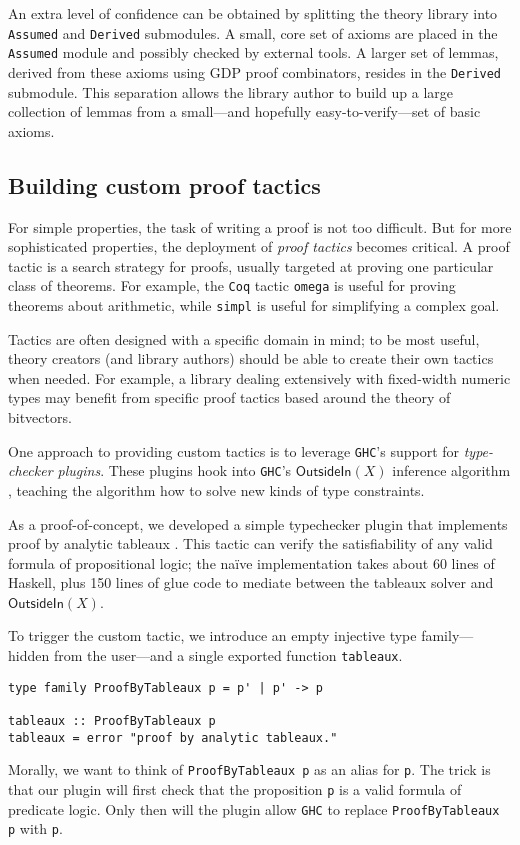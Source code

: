 \documentclass[format=sigplan, review=false, screen=true]{acmart}
\begin{document}
An extra level of confidence can be obtained by splitting the theory library
into \texttt{Assumed} and \texttt{Derived} submodules. A small, core set of
axioms are placed in the \texttt{Assumed} module and possibly checked by
external tools. A larger set of lemmas, derived from these axioms using GDP
proof combinators, resides in the \texttt{Derived} submodule. This separation
allows the library author to build up a large collection of lemmas from a
small---and hopefully easy-to-verify---set of basic axioms.

\subsection{Building custom proof tactics}\label{tactics}

For simple properties, the task of writing a proof is not too difficult. But for
more sophisticated properties, the deployment of \emph{proof tactics} becomes
critical. A proof tactic is a search strategy for proofs, usually targeted at
proving one particular class of theorems. For example, the \texttt{Coq} tactic
\texttt{omega} is useful for proving theorems about arithmetic, while
\texttt{simpl} is useful for simplifying a complex goal.

Tactics are often designed with a specific domain in mind; to be most useful,
theory creators (and library authors) should be able to create their own tactics
when needed. For example, a library dealing extensively with fixed-width numeric types
may benefit from specific proof tactics based around the theory of bitvectors.

One approach to providing custom tactics is to leverage \texttt{GHC}'s support for
\emph{type-checker plugins}. These plugins hook into \texttt{GHC}'s $\textsf{OutsideIn}(X)$
inference algorithm \cite{vytiniotis2011outsidein}, teaching the algorithm how to solve
new kinds of type constraints.

As a proof-of-concept, we developed a simple typechecker plugin that implements
proof by analytic tableaux \cite{smullyan1995first}. This tactic can verify the satisfiability of any
valid formula of propositional logic; the na\"ive implementation takes about
60 lines of Haskell, plus 150 lines of glue code to mediate between
the tableaux solver and $\textsf{OutsideIn}(X)$.

To trigger the custom tactic, we introduce an empty injective type family---hidden
from the user---and a single exported function \texttt{tableaux}.
\begin{verbatim}
type family ProofByTableaux p = p' | p' -> p

tableaux :: ProofByTableaux p
tableaux = error "proof by analytic tableaux."
\end{verbatim}
Morally, we want to think of \texttt{ProofByTableaux p} as an alias for \texttt{p}.
The trick is that our plugin will first check that the proposition \texttt{p} is
a valid formula of predicate logic. Only then will the plugin allow \texttt{GHC}
to replace \texttt{ProofByTableaux p} with \texttt{p}.
\end{document}
